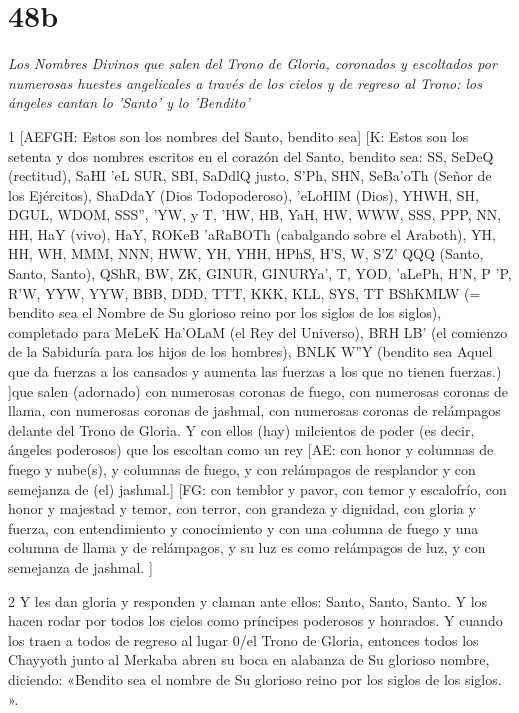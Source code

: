 \chapter{48b}

\par \textit{Los Nombres Divinos que salen del Trono de Gloria, coronados y escoltados por numerosas huestes angelicales a través de los cielos y de regreso al Trono: los ángeles cantan lo 'Santo' y lo 'Bendito'}

\par 1 [AEFGH: Estos son los nombres del Santo, bendito sea] [K: Estos son los setenta y dos nombres escritos en el corazón del Santo, bendito sea: SS, SeDeQ (rectitud), SaHI 'eL SUR, SBI, SaDdlQ {justo}, S'Ph, SHN, SeBa'oTh (Señor de los Ejércitos), ShaDdaY (Dios Todopoderoso), 'eLoHIM (Dios), YHWH, SH, DGUL, WDOM, SSS'', 'YW, y T, 'HW, HB, YaH, HW, WWW, SSS, PPP, NN, HH, HaY (vivo), HaY, ROKeB 'aRaBOTh (cabalgando sobre el Araboth), YH, HH, WH, MMM, NNN, HWW, YH, YHH, HPhS, H'S, W, S'Z' QQQ (Santo, Santo, Santo), QShR, BW, ZK, GINUR, GINURYa', T, YOD, 'aLePh, H'N, P 'P, R'W, YYW, YYW, BBB, DDD, TTT, KKK, KLL, SYS, TT BShKMLW (= bendito sea el Nombre de Su glorioso reino por los siglos de los siglos), completado para MeLeK Ha'OLaM (el Rey del Universo), BRH LB' (el comienzo de la Sabiduría para los hijos de los hombres), BNLK W''Y (bendito sea Aquel que da fuerzas a los cansados ​​y aumenta las fuerzas a los que no tienen fuerzas.) ]que salen (adornado) con numerosas coronas de fuego, con numerosas coronas de llama, con numerosas coronas de jashmal, con numerosas coronas de relámpagos delante del Trono de Gloria. Y con ellos (hay) milcientos de poder (es decir, ángeles poderosos) que los escoltan como un rey [AE: con honor y columnas de fuego y nube(s), y columnas de fuego, y con relámpagos de resplandor y con semejanza de (el) jashmal.] [FG: con temblor y pavor, con temor y escalofrío, con honor y majestad y temor, con terror, con grandeza y dignidad, con gloria y fuerza, con entendimiento y conocimiento y con una columna de fuego y una columna de llama y de relámpagos, y su luz es como relámpagos de luz, y con semejanza de jashmal. ]

\par 2 Y les dan gloria y responden y claman ante ellos: Santo, Santo, Santo. Y los hacen rodar por todos los cielos como príncipes poderosos y honrados. Y cuando los traen a todos de regreso al lugar 0/el Trono de Gloria, entonces todos los Chayyoth junto al Merkaba abren su boca en alabanza de Su glorioso nombre, diciendo: «Bendito sea el nombre de Su glorioso reino por los siglos de los siglos. ».




